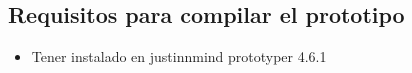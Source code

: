 \documentclass[a4paper,11pt]{article}
\begin{document}
    \subsection{ Requisitos para compilar el prototipo}
\begin{itemize}
\item Tener instalado en justinnmind prototyper 4.6.1

\end{itemize}


\begin{figure}[ht!]
 
   \centering
   \hspace{0.1\linewidth}
   \\[20pt]
    
\end{figure}
\newpage
\end{document}

